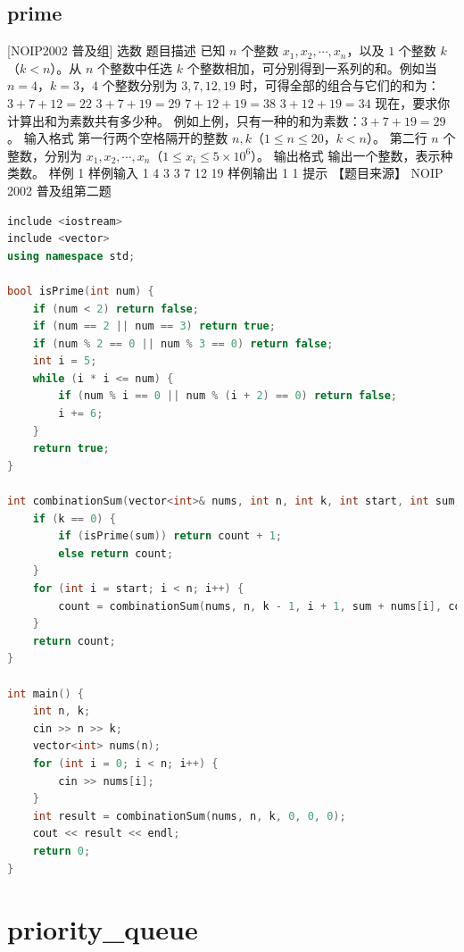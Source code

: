 \documentclass[12pt,twiside,a4paper]{ctexbook}
\numberwithin{chapter}{part}
\begin{document}
\section{prime}
 [NOIP2002 普及组] 选数
 题目描述
已知 $n$ 个整数 $x_1,x_2,\cdots,x_n$，以及 $1$ 个整数 $k$（$k<n$）。从 $n$ 个整数中任选 $k$ 个整数相加，可分别得到一系列的和。例如当 $n=4$，$k=3$，$4$ 个整数分别为 $3,7,12,19$ 时，可得全部的组合与它们的和为：
$3+7+12=22$
$3+7+19=29$
$7+12+19=38$
$3+12+19=34$
现在，要求你计算出和为素数共有多少种。
例如上例，只有一种的和为素数：$3+7+19=29$。
 输入格式
第一行两个空格隔开的整数 $n,k$（$1 \le n \le 20$，$k<n$）。
第二行 $n$ 个整数，分别为 $x_1,x_2,\cdots,x_n$（$1 \le x_i \le 5\times 10^6$）。
 输出格式
输出一个整数，表示种类数。
 样例 1
 样例输入 1
4 3
3 7 12 19
 样例输出 1
1
 提示
【题目来源】
NOIP 2002 普及组第二题
\begin{lstlisting}[language=c++,breaklines=true]
include <iostream>
include <vector>
using namespace std;

bool isPrime(int num) {
    if (num < 2) return false;
    if (num == 2 || num == 3) return true;
    if (num % 2 == 0 || num % 3 == 0) return false;
    int i = 5;
    while (i * i <= num) {
        if (num % i == 0 || num % (i + 2) == 0) return false;
        i += 6;
    }
    return true;
}

int combinationSum(vector<int>& nums, int n, int k, int start, int sum, int count) {
    if (k == 0) {
        if (isPrime(sum)) return count + 1;
        else return count;
    }
    for (int i = start; i < n; i++) {
        count = combinationSum(nums, n, k - 1, i + 1, sum + nums[i], count);
    }
    return count;
}

int main() {
    int n, k;
    cin >> n >> k;
    vector<int> nums(n);
    for (int i = 0; i < n; i++) {
        cin >> nums[i];
    }
    int result = combinationSum(nums, n, k, 0, 0, 0);
    cout << result << endl;
    return 0;
}
\end{lstlisting}

\chapter{priority\_queue}
\end{document}
